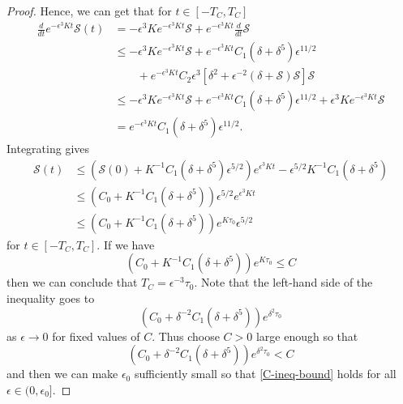 \documentclass[oneside,reqno]{amsart}
\begin{document}
\begin{proof}
	Hence, we can get that for \(t \in [-T_{C}, T_{C}]\) 
	\begin{equation*}
		\begin{aligned}
			\frac d {dt} e^{-\epsilon^3 K t} \mathcal S(t) &= - \epsilon^3 K e^{-\epsilon^3 K t} \mathcal S  + e^{-\epsilon^3 K t} \frac d {dt} \mathcal S \\
			&\leq - \epsilon^3 K e^{-\epsilon^3 K t} \mathcal S  + e^{-\epsilon^3 K t}C_1(\delta + \delta^5) \epsilon^{11/2} \\
			&\qquad+ e^{-\epsilon^3 K t}C_2 \epsilon^3\left[ \delta^2 + \epsilon^{-2}(\delta + \mathcal S) \mathcal S \right]\mathcal S \\
			&\leq - \epsilon^3 K e^{-\epsilon^3 K t} \mathcal S  +  e^{-\epsilon^3 K t}C_1(\delta + \delta^5) \epsilon^{11/2} + \epsilon^3 K e^{-\epsilon^3 K t}\mathcal S \\
			&= e^{-\epsilon^3 K t}C_1(\delta + \delta^5) \epsilon^{11/2}.
		\end{aligned}
	\end{equation*}
	Integrating gives
	\begin{equation*} 
		\begin{aligned}
			\mathcal S(t) &\leq \left( \mathcal S(0) + K^{-1} C_1 (\delta+\delta^5) \epsilon^{5/2} \right) e^{\epsilon^3 K t} - \epsilon^{5/2} K^{-1} C_1 (\delta + \delta^5) \\
			&\leq \left(C_0+ K^{-1} C_1 (\delta+\delta^5)  \right) \epsilon^{5/2}e^{\epsilon^3 K t} \\
			&\leq (C_0 + K^{-1} C_1 (\delta+\delta^5) ) e^{K\tau_0} \epsilon^{5/2}
		\end{aligned}
	\end{equation*}
	for \(t \in [-T_{C}, T_{C}]\). If we have 
	\begin{equation}\label{C-ineq-bound}
		(C_0 + K^{-1} C_1 (\delta+\delta^5) ) e^{K\tau_0}  \leq C
	\end{equation} 
	then we can conclude that \(T_C = \epsilon^{-3}\tau_0.\) Note that the left-hand side of the inequality goes to 
	\begin{equation*}
		(C_0 + \delta^{-2} C_1 (\delta+\delta^5) ) e^{\delta^2\tau_0}
	\end{equation*}
	as \(\epsilon \to 0\) for fixed values of \(C\). Thus choose \(C>0\) large enough so that
	\begin{equation*}
		(C_0 + \delta^{-2} C_1 (\delta+\delta^5) ) e^{\delta^2\tau_0} < C
	\end{equation*}
	and then we can make \(\epsilon_0\) sufficiently small so that \cref{C-ineq-bound} holds for all \(\epsilon \in (0,\epsilon_0]\).
\end{proof}
\end{document}
